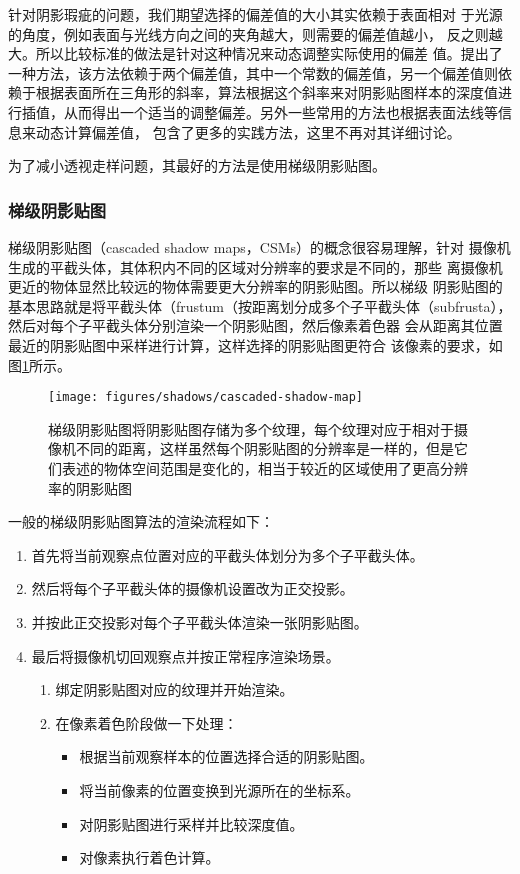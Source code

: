 针对阴影瑕疵的问题，我们期望选择的偏差值的大小其实依赖于表面相对 于光源的角度，例如表面与光线方向之间的夹角越大，则需要的偏差值越小， 反之则越大。所以比较标准的做法是针对这种情况来动态调整实际使用的偏差 值。\cite{a:Eliminatesurfaceacnewithgradientshadowmapping}提出了一种方法，该方法依赖于两个偏差值，其中一个常数的偏差值，另一个偏差值则依赖于根据表面所在三角形的斜率，算法根据这个斜率来对阴影贴图样本的深度值进行插值，从而得出一个适当的调整偏差。另外一些常用的方法也根据表面法线等信息来动态计算偏差值\cite{a:Adaptivedepthbiasforshadowmaps}， \cite{b:rts}包含了更多的实践方法，这里不再对其详细讨论。

  为了减小透视走样问题，其最好的方法是使用梯级阴影贴图。




\subsubsection{梯级阴影贴图}
梯级阴影贴图（cascaded shadow maps，CSMs）的概念很容易理解，针对 摄像机生成的平截头体，其体积内不同的区域对分辨率的要求是不同的，那些 离摄像机更近的物体显然比较远的物体需要更大分辨率的阴影贴图。所以梯级 阴影贴图的基本思路就是将平截头体（frustum（按距离划分成多个子平截头体（subfrusta），然后对每个子平截头体分别渲染一个阴影贴图，然后像素着色器 会从距离其位置最近的阴影贴图中采样进行计算，这样选择的阴影贴图更符合 该像素的要求，如图\ref{f:df-cascaded-shadow-map}所示。

\begin{figure}
\sidecaption
	\texttt{[image: figures/shadows/cascaded-shadow-map]}
	\caption{梯级阴影贴图将阴影贴图存储为多个纹理，每个纹理对应于相对于摄像机不同的距离，这样虽然每个阴影贴图的分辨率是一样的，但是它们表述的物体空间范围是变化的，相当于较近的区域使用了更高分辨率的阴影贴图}
	\label{f:df-cascaded-shadow-map}
\end{figure}

一般的梯级阴影贴图算法的渲染流程如下：

\begin{enumerate}
	\item 首先将当前观察点位置对应的平截头体划分为多个子平截头体。 
	\item 然后将每个子平截头体的摄像机设置改为正交投影。
	\item 并按此正交投影对每个子平截头体渲染一张阴影贴图。
	\item 最后将摄像机切回观察点并按正常程序渲染场景。
	
	\begin{enumerate}
		\item 绑定阴影贴图对应的纹理并开始渲染。 
		\item 在像素着色阶段做一下处理：
		\begin{itemize}
			\item 根据当前观察样本的位置选择合适的阴影贴图。 
			\item 将当前像素的位置变换到光源所在的坐标系。
			\item 对阴影贴图进行采样并比较深度值。
			\item 对像素执行着色计算。
		\end{itemize}
	\end{enumerate}
\end{enumerate}


